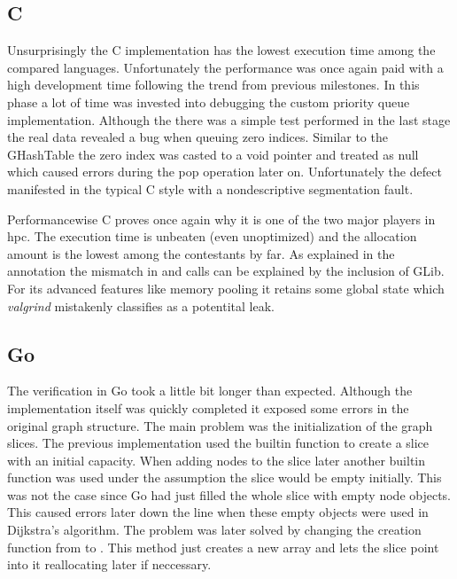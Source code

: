 \subsection{C}
\label{subsec:Implementation::Verification::C}

Unsurprisingly the C implementation has the lowest execution time among the compared languages. Unfortunately the performance was once again paid with a high development time following the trend from previous milestones. In this phase a lot of time was invested into debugging the custom priority queue implementation. Although the there was a simple test performed in the last stage the real data revealed a bug when queuing zero indices. Similar to the GHashTable the zero index was casted to a void pointer and treated as null which caused errors during the pop operation later on. Unfortunately the defect manifested in the typical C style with a nondescriptive segmentation fault.

Performancewise C proves once again why it is one of the two major players in \gls{hpc}. The execution time is unbeaten (even unoptimized) and the allocation amount is the lowest among the contestants by far. As explained in the annotation the mismatch in  and  calls can be explained by the inclusion of GLib. For its advanced features like memory pooling it retains some global state which \textit{valgrind} mistakenly classifies as a potentital leak.

\subsection{Go}
\label{subsec:Implementation::Verification::Go}

The verification in Go took a little bit longer than expected. Although the implementation itself was quickly completed it exposed some errors in the original graph structure. The main problem was the initialization of the graph slices. The previous implementation used the builtin function  to create a slice with an initial capacity. When adding nodes to the slice later another builtin function  was used under the assumption the slice would be empty initially. This was not the case since Go had just filled the whole slice with empty node objects. This caused errors later down the line when these empty objects were used in Dijkstra's algorithm. The problem was later solved by changing the creation function from  to . This method just creates a new array and lets the slice point into it reallocating later if neccessary.

